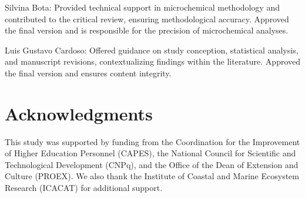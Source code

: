 \documentclass[utf8]{FrontiersinHarvard}
\begin{document}
Silvina Bota: Provided technical support in microchemical methodology
and contributed to the critical review, ensuring methodological
accuracy. Approved the final version and is responsible for the
precision of microchemical analyses.

Luis Gustavo Cardoso: Offered guidance on study conception, statistical
analysis, and manuscript revisions, contextualizing findings within the
literature. Approved the final version and ensures content integrity.

\section*{Acknowledgments}\label{acknowledgments}

This study was supported by funding from the Coordination for the
Improvement of Higher Education Personnel (CAPES), the National Council
for Scientific and Technological Development (CNPq), and the Office of
the Dean of Extension and Culture (PROEX). We also thank the Institute
of Coastal and Marine Ecosystem Research (ICACAT) for additional
support.
\end{document}
